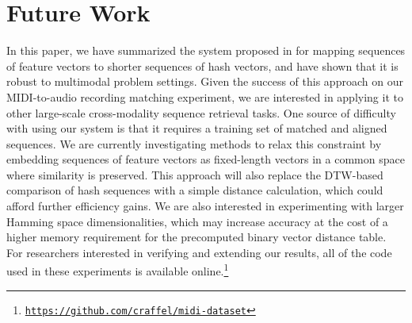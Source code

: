 \documentclass{article} %
\begin{document}
\section{Future Work}

In this paper, we have summarized the system proposed in \cite{raffel2015large} for mapping sequences of feature vectors to shorter sequences of hash vectors, and have shown that it is robust to multimodal problem settings.
Given the success of this approach on our MIDI-to-audio recording matching experiment, we are interested in applying it to other large-scale cross-modality sequence retrieval tasks.
One source of difficulty with using our system is that it requires a training set of matched and aligned sequences.
We are currently investigating methods to relax this constraint by embedding sequences of feature vectors as fixed-length vectors in a common space where similarity is preserved.
This approach will also replace the DTW-based comparison of hash sequences with a simple distance calculation, which could afford further efficiency gains.
We are also interested in experimenting with larger Hamming space dimensionalities, which may increase accuracy at the cost of a higher memory requirement for the precomputed binary vector distance table.
For researchers interested in verifying and extending our results, all of the code used in these experiments is available online.\footnote{\href{https://github.com/craffel/midi-dataset}{\texttt{https://github.com/craffel/midi-dataset}}}


\small

\end{document}

